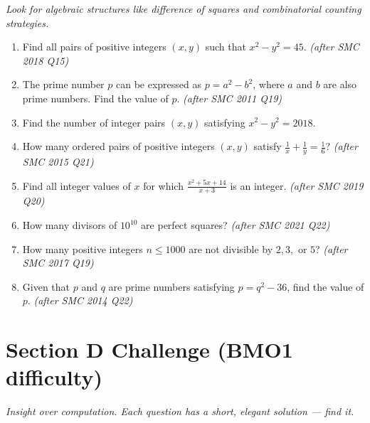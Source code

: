 \documentclass[11pt,a4paper]{article}
\begin{document}
\noindent\textit{Look for algebraic structures like difference of squares and combinatorial counting strategies.}

\begin{enumerate}

\item Find all pairs of positive integers $(x, y)$ such that $x^2 - y^2 = 45$. \textit{\small(after SMC 2018 Q15)}

\item The prime number $p$ can be expressed as $p = a^2 - b^2$, where $a$ and $b$ are also prime numbers. Find the value of $p$. \textit{\small(after SMC 2011 Q19)}

\item Find the number of integer pairs $(x,y)$ satisfying $x^2 - y^2 = 2018$.

\item How many ordered pairs of positive integers $(x, y)$ satisfy $\frac{1}{x} + \frac{1}{y} = \frac{1}{6}$? \textit{\small(after SMC 2015 Q21)}

\item Find all integer values of $x$ for which $\frac{x^2 + 5x + 14}{x+3}$ is an integer. \textit{\small(after SMC 2019 Q20)}

\item How many divisors of $10^{10}$ are perfect squares? \textit{\small(after SMC 2021 Q22)}

\item How many positive integers $n \leq 1000$ are not divisible by $2, 3,$ or $5$? \textit{\small(after SMC 2017 Q19)}

\item Given that $p$ and $q$ are prime numbers satisfying $p = q^2 - 36$, find the value of $p$. \textit{\small(after SMC 2014 Q22)}

\end{enumerate}

\section*{Section D \quad Challenge \hfill{\normalfont\small(BMO1 difficulty)}}

\noindent\textit{Insight over computation. Each question has a short, elegant solution --- find it.}
\end{document}
